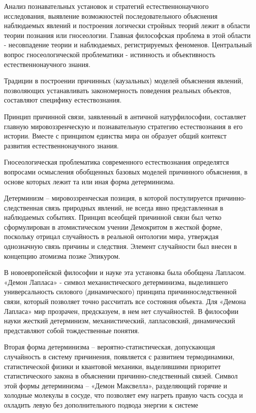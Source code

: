 \documentclass[exam_answers.tex]{subfiles}
\begin{document}
\renewcommand{\baselinestretch}{\blch}

Анализ познавательных установок и стратегий естественнонаучного
исследования, выявление возможностей последовательного объяснения
наблюдаемых явлений и построения логически стройных теорий лежит в
области теории познания или гносеологии.
Главная философская проблема в
этой области - несовпадение теории и наблюдаемых, регистрируемых
феноменов. Центральный вопрос гносеологической проблематики - истинность
и объективность естественнонаучного знания.

Традиции в построении причинных (каузальных) моделей объяснения
явлений, позволяющих устанавливать закономерность поведения реальных
объектов, составляют специфику естествознания.


Принцип причинной связи, заявленный в античной натурфилософии,
составляет главную мировоззренческую и познавательную стратегию
естествознания в его истории. Вместе с принципом единства мира он образует
общий контекст развития естественнонаучного знания.

Гносеологическая проблематика современного естествознания определятся
вопросами осмысления обобщенных базовых моделей причинного объяснения,
в основе которых лежит та или иная форма детерминизма.

Детерминизм – мировоззренческая позиция, в которой постулируется
причинно-следственная связь природных явлений, не всегда явно
представленная в наблюдаемых событиях. Принцип всеобщей причинной связи
был четко сформулирован в атомистическом учении Демокритом в жесткой
форме, поскольку отрицал случайность в реальной онтологии мира, утверждая
однозначную связь причины и следствия. Элемент случайности был внесен в
концепцию атомизма позже Эпикуром.

В новоевропейской философии и науке эта установка была обобщена
Лапласом. «Демон Лапласа» - символ механистического детерминизма,
выделившего универсальность силового (динамического) принципа причинноследственной связи,
который позволяет точно рассчитать все состояния
объекта. Для «Демона Лапласа» мир прозрачен, предсказуем, в нем нет
случайностей. В философии науки жесткий детерминизм, механистический,
лапласовский, динамический представляют собой тождественные понятия.

Вторая форма детерминизма – вероятно-статистическая, допускающая
случайность в систему причинения, появляется с развитием термодинамики,
статистической физики и квантовой механики, выделившими приоритет
статистического закона в объяснении причинно-следственный связей. Символ
этой формы детерминизма – «Демон Максвелла», разделяющий горячие и
холодные молекулы в сосуде, что позволяет ему нагреть правую часть сосуда и
охладить левую без дополнительного подвода энергии к системе
\end{document}
